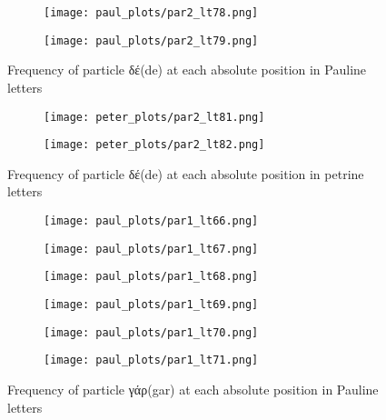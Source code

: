 \documentclass[a4paper]{article}
\renewcommand{\textgreek}[1]{{\selectlanguage{greek}#1}}
\begin{document}
\begin{figure}
\ContinuedFloat
\begin{subfigure}{0.45\textwidth}
\centering
\texttt{[image: paul\_plots/par2\_lt78.png]}
\end{subfigure}
\begin{subfigure}{0.45\textwidth}
\centering
\texttt{[image: paul\_plots/par2\_lt79.png]}
\end{subfigure}
\caption{Frequency of particle \textgreek{δέ}(de) at each absolute position in Pauline letters}
\end{figure}

\begin{figure}
\begin{subfigure}{0.45\textwidth}
\centering
\texttt{[image: peter\_plots/par2\_lt81.png]}
\end{subfigure}
\begin{subfigure}{0.45\textwidth}
\centering
\texttt{[image: peter\_plots/par2\_lt82.png]}
\end{subfigure}
\caption{Frequency of particle \textgreek{δέ}(de) at each absolute position in petrine letters}
\label{peter_de}
\end{figure}

\begin{figure}
\begin{subfigure}{0.45\textwidth}
\centering
\texttt{[image: paul\_plots/par1\_lt66.png]}
\end{subfigure}
\begin{subfigure}{0.45\textwidth}
\centering
\texttt{[image: paul\_plots/par1\_lt67.png]}
\end{subfigure}
\begin{subfigure}{0.45\textwidth}
\centering
\texttt{[image: paul\_plots/par1\_lt68.png]}
\end{subfigure}
\begin{subfigure}{0.45\textwidth}
\centering
\texttt{[image: paul\_plots/par1\_lt69.png]}
\end{subfigure}
\begin{subfigure}{0.45\textwidth}
\centering
\texttt{[image: paul\_plots/par1\_lt70.png]}
\end{subfigure}
\begin{subfigure}{0.45\textwidth}
\centering
\texttt{[image: paul\_plots/par1\_lt71.png]}
\end{subfigure}
\caption{Frequency of particle \textgreek{γάρ}(gar) at each absolute position in Pauline letters}
\label{paul_yap}
\end{figure}
\end{document}
